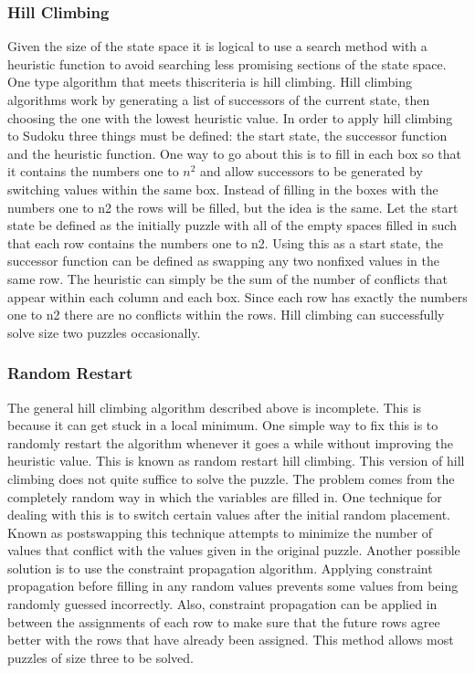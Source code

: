 \documentclass[fleqn,10pt]{SelfArx}
\begin{document}
\subsubsection{Hill Climbing}
Given the size of the state space it is logical to use a search method with a heuristic function
to avoid searching less promising sections of the state space. One type algorithm that meets thiscriteria is hill climbing. Hill climbing algorithms work by generating a list of successors of the
current state, then choosing the one with the lowest heuristic value. In order to apply hill climbing
to Sudoku three things must be defined: the start state, the successor function and the heuristic
function. One way to go about this is to fill in each box so that it contains the numbers one to $n^2$ and
allow successors to be generated by switching values within the same box. Instead of
filling in the boxes with the numbers one to n2 the rows will be filled, but the idea is the same. Let
the start state be defined as the initially puzzle with all of the empty spaces filled in such that each
row contains the numbers one to n2. Using this as a start state, the successor function can be
defined as swapping any two nonfixed
values in the same row. The heuristic can simply be the sum
of the number of conflicts that appear within each column and each box. Since each row has exactly
the numbers one to n2 there are no conflicts within the rows. Hill climbing can successfully solve
size two puzzles occasionally.
\subsubsection{Random Restart}
The general hill climbing algorithm described above is incomplete. This is because it can
get stuck in a local minimum. One simple way to fix this is to randomly restart the algorithm
whenever it goes a while without improving the heuristic value. This is known as random restart
hill climbing. This version of hill climbing does not quite suffice to solve
the puzzle. The problem comes from the completely random way in which the variables are filled
in. One technique for dealing with this is to switch certain values after the initial random
placement. Known as postswapping
this technique attempts to minimize the number of values that
conflict with the values given in the original puzzle. Another possible solution is
to use the constraint propagation algorithm. Applying constraint propagation before filling in any
random values prevents some values from being randomly guessed incorrectly. Also, constraint
propagation can be applied in between the assignments of each row to make sure that the future
rows agree better with the rows that have already been assigned. This method allows most puzzles
of size three to be solved.
\end{document}
